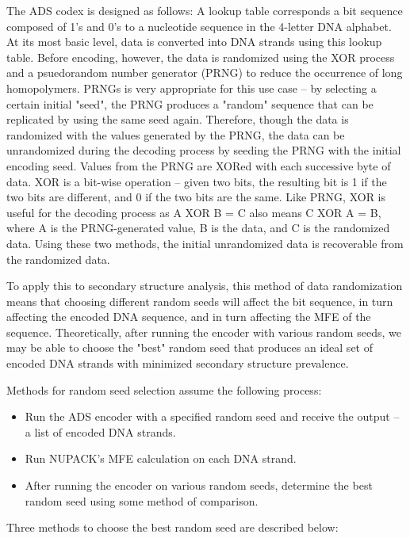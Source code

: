 \documentclass{article}
\begin{document}
The ADS codex is designed as follows: A lookup table corresponds a bit sequence composed of 1's and 0's to a nucleotide sequence in the 4-letter DNA alphabet. At its most basic level, data is converted into DNA strands using this lookup table. Before encoding, however, the data is randomized using the XOR process and a psuedorandom number generator (PRNG) to reduce the occurrence of long homopolymers. PRNGs is very appropriate for this use case -- by selecting a certain initial "seed", the PRNG produces a "random" sequence that can be replicated by using the same seed again. Therefore, though the data is randomized with the values generated by the PRNG, the data can be unrandomized during the decoding process by seeding the PRNG with the initial encoding seed. Values from the PRNG are XORed with each successive byte of data. XOR is a bit-wise operation -- given two bits, the resulting bit is 1 if the two bits are different, and 0 if the two bits are the same. Like PRNG, XOR is useful for the decoding process as A XOR B = C also means C XOR A = B, where A is the PRNG-generated value, B is the data, and C is the randomized data. Using these two methods, the initial unrandomized data is recoverable from the randomized data. 

To apply this to secondary structure analysis, this method of data randomization means that choosing different random seeds will affect the bit sequence, in turn affecting the encoded DNA sequence, and in turn affecting the MFE of the sequence. Theoretically, after running the encoder with various random seeds, we may be able to choose the "best" random seed that produces an ideal set of encoded DNA strands with minimized secondary structure prevalence. 

Methods for random seed selection assume the following process:
\begin{itemize}
    \item Run the ADS encoder with a specified random seed and receive the output -- a list of encoded DNA strands.
    \item Run NUPACK's MFE calculation on each DNA strand.
    \item After running the encoder on various random seeds, determine the best random seed using some method of comparison.
\end{itemize}

Three methods to choose the best random seed are described below:
\end{document}
